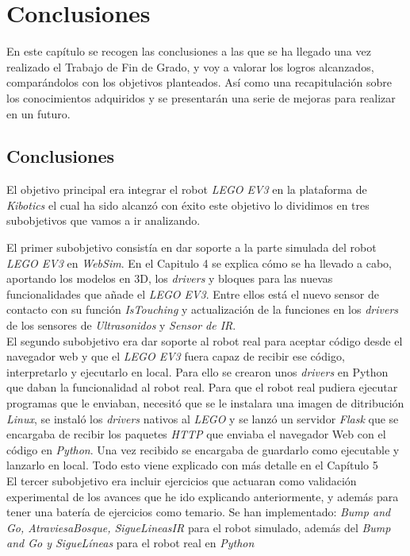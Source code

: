 \chapter{Conclusiones}
\label{chap:conclusiones}

En este capítulo se recogen las conclusiones a las que se ha llegado una vez realizado el Trabajo de Fin de Grado, y voy a valorar los logros alcanzados, comparándolos con los objetivos planteados. Así como una recapitulación sobre los conocimientos adquiridos y se presentarán una serie de mejoras para realizar en un futuro.

\section{Conclusiones}
\label{sec:conclusiones}
El objetivo principal era  integrar el robot \textit{LEGO EV3} en la plataforma de \textit{Kibotics} el cual ha sido alcanzó con éxito este objetivo lo dividimos en tres subobjetivos que vamos a ir analizando.

El primer subobjetivo consistía en dar soporte a la parte simulada del robot  \textit{LEGO EV3} en \textit{WebSim}. En el Capitulo 4 se explica cómo se ha llevado a cabo, aportando los modelos en 3D, los \textit{drivers} y bloques para las nuevas funcionalidades que añade el \textit{LEGO EV3}. Entre ellos está el nuevo sensor de contacto con su función \textit{IsTouching} y actualización de la funciones en los \textit{drivers} de los sensores de \textit{Ultrasonidos} y \textit{Sensor de IR}.\\

El segundo subobjetivo era dar soporte al robot real para aceptar código desde el navegador web y que el \textit{LEGO EV3} fuera capaz de recibir ese código, interpretarlo y ejecutarlo en local. Para ello se crearon unos \textit{drivers} en Python que daban la funcionalidad al robot real. Para que el robot real pudiera ejecutar programas que le enviaban, necesitó que se le instalara una imagen de ditribución \textit{Linux}, se instaló los \textit{drivers} nativos al \textit{LEGO} y se lanzó un servidor \textit{Flask} que se encargaba de recibir los paquetes \textit{HTTP} que enviaba el navegador Web con el código en \textit{Python}. Una vez recibido se encargaba de guardarlo como ejecutable y lanzarlo en local. Todo esto viene explicado con más detalle en el Capítulo 5\\

El tercer subobjetivo era incluir ejercicios que actuaran como validación experimental de los avances que he ido explicando anteriormente, y además para tener una batería de ejercicios como temario. Se han implementado: \textit{Bump and Go, AtraviesaBosque, SigueLineasIR } para el robot simulado, además del \textit{Bump and Go y SigueLíneas} para el robot real en \textit{Python}

